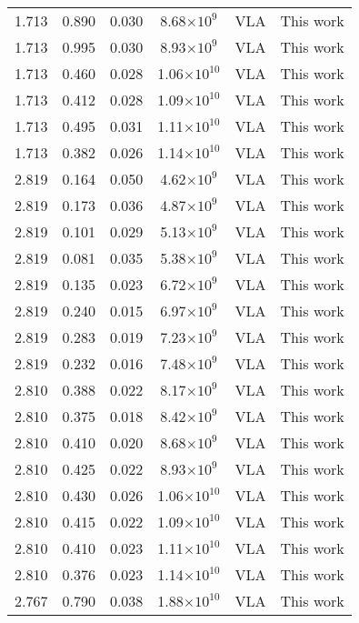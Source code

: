 \documentclass{aa}
\begin{document}
{\begin{longtable}{c|c|c|c|c|c}
  1.713 &   0.890   &  0.030 &  8.68$\times 10^{9}$  &  VLA & This work \\
  1.713 &   0.995   &  0.030 &  8.93$\times 10^{9}$  &  VLA & This work \\
  1.713 &   0.460   &  0.028 &  1.06$\times 10^{10}$ &  VLA & This work \\
  1.713 &   0.412   &  0.028 &  1.09$\times 10^{10}$ &  VLA & This work \\
  1.713 &   0.495   &  0.031 &  1.11$\times 10^{10}$ &  VLA & This work \\
  1.713 &   0.382   &  0.026 &  1.14$\times 10^{10}$ &  VLA & This work \\
  2.819 &   0.164   &  0.050 &  4.62$\times 10^{9}$  &  VLA & This work \\
  2.819 &   0.173   &  0.036 &  4.87$\times 10^{9}$  &  VLA & This work \\
  2.819 &   0.101   &  0.029 &  5.13$\times 10^{9}$  &  VLA & This work \\
  2.819 &   0.081   &  0.035 &  5.38$\times 10^{9}$  &  VLA & This work \\
  2.819 &   0.135   &  0.023 &  6.72$\times 10^{9}$  &  VLA & This work \\
  2.819 &   0.240   &  0.015 &  6.97$\times 10^{9}$  &  VLA & This work \\
  2.819 &   0.283   &  0.019 &  7.23$\times 10^{9}$  &  VLA & This work \\
  2.819 &   0.232   &  0.016 &  7.48$\times 10^{9}$  &  VLA & This work \\
  2.810 &   0.388   &  0.022 &  8.17$\times 10^{9}$  &  VLA & This work \\
  2.810 &   0.375   &  0.018 &  8.42$\times 10^{9}$  &  VLA & This work \\
  2.810 &   0.410   &  0.020 &  8.68$\times 10^{9}$  &  VLA & This work \\
  2.810 &   0.425   &  0.022 &  8.93$\times 10^{9}$  &  VLA & This work \\
  2.810 &   0.430   &  0.026 &  1.06$\times 10^{10}$ &  VLA & This work \\
  2.810 &   0.415   &  0.022 &  1.09$\times 10^{10}$ &  VLA & This work \\
  2.810 &   0.410   &  0.023 &  1.11$\times 10^{10}$ &  VLA & This work \\
  2.810 &   0.376   &  0.023 &  1.14$\times 10^{10}$ &  VLA & This work \\
  2.767 &   0.790   &  0.038 &  1.88$\times 10^{10}$ &  VLA & This work \\

\end{longtable}}
\end{document}
